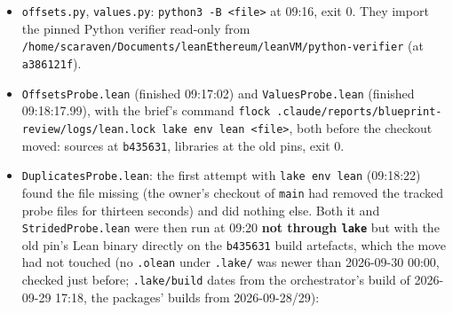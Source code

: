 \begin{itemize}
\item \texttt{offsets.\allowbreak{}py}, \texttt{values.\allowbreak{}py}: \texttt{python3 -{}B <file>} at 09:16, exit 0. They import the pinned Python verifier read-only from \texttt{/\allowbreak{}h\allowbreak{}o\allowbreak{}m\allowbreak{}e\allowbreak{}/\allowbreak{}s\allowbreak{}c\allowbreak{}a\allowbreak{}r\allowbreak{}a\allowbreak{}v\allowbreak{}e\allowbreak{}n\allowbreak{}/\allowbreak{}D\allowbreak{}o\allowbreak{}c\allowbreak{}u\allowbreak{}m\allowbreak{}e\allowbreak{}n\allowbreak{}t\allowbreak{}s\allowbreak{}/\allowbreak{}l\allowbreak{}e\allowbreak{}a\allowbreak{}n\allowbreak{}E\allowbreak{}t\allowbreak{}h\allowbreak{}e\allowbreak{}r\allowbreak{}e\allowbreak{}u\allowbreak{}m\allowbreak{}/\allowbreak{}l\allowbreak{}e\allowbreak{}a\allowbreak{}n\allowbreak{}V\allowbreak{}M\allowbreak{}/\allowbreak{}p\allowbreak{}y\allowbreak{}t\allowbreak{}h\allowbreak{}o\allowbreak{}n\allowbreak{}-{}\allowbreak{}v\allowbreak{}e\allowbreak{}r\allowbreak{}i\allowbreak{}f\allowbreak{}i\allowbreak{}e\allowbreak{}r} (at \texttt{a386121f}).
\item \texttt{OffsetsProbe.\allowbreak{}lean} (finished 09:17:02) and \texttt{ValuesProbe.\allowbreak{}lean} (finished 09:18:17.99), with the brief's command \texttt{f\allowbreak{}l\allowbreak{}o\allowbreak{}c\allowbreak{}k\allowbreak{} .\allowbreak{}c\allowbreak{}l\allowbreak{}a\allowbreak{}u\allowbreak{}d\allowbreak{}e\allowbreak{}/\allowbreak{}r\allowbreak{}e\allowbreak{}p\allowbreak{}o\allowbreak{}r\allowbreak{}t\allowbreak{}s\allowbreak{}/\allowbreak{}b\allowbreak{}l\allowbreak{}u\allowbreak{}e\allowbreak{}p\allowbreak{}r\allowbreak{}i\allowbreak{}n\allowbreak{}t\allowbreak{}-{}\allowbreak{}r\allowbreak{}e\allowbreak{}v\allowbreak{}i\allowbreak{}e\allowbreak{}w\allowbreak{}/\allowbreak{}l\allowbreak{}o\allowbreak{}g\allowbreak{}s\allowbreak{}/\allowbreak{}l\allowbreak{}e\allowbreak{}a\allowbreak{}n\allowbreak{}.\allowbreak{}l\allowbreak{}o\allowbreak{}c\allowbreak{}k\allowbreak{} l\allowbreak{}a\allowbreak{}k\allowbreak{}e\allowbreak{} e\allowbreak{}n\allowbreak{}v\allowbreak{} l\allowbreak{}e\allowbreak{}a\allowbreak{}n\allowbreak{} <\allowbreak{}f\allowbreak{}i\allowbreak{}l\allowbreak{}e\allowbreak{}>}, both before the checkout moved: sources at \texttt{b435631}, libraries at the old pins, exit 0.
\item \texttt{DuplicatesProbe.\allowbreak{}lean}: the first attempt with \texttt{lake env lean} (09:18:22) found the file missing (the owner's checkout of \texttt{main} had removed the tracked probe files for thirteen seconds) and did nothing else. Both it and \texttt{StridedProbe.\allowbreak{}lean} were then run at 09:20 \textbf{not through \texttt{lake}} but with the old pin's Lean binary directly on the \texttt{b435631} build artefacts, which the move had not touched (no \texttt{.\allowbreak{}olean} under \texttt{.\allowbreak{}lake/} was newer than 2026-09-30 00:00, checked just before; \texttt{.\allowbreak{}lake/\allowbreak{}build} dates from the orchestrator's build of 2026-09-29 17:18, the packages' builds from 2026-09-28/29):


\end{itemize}

